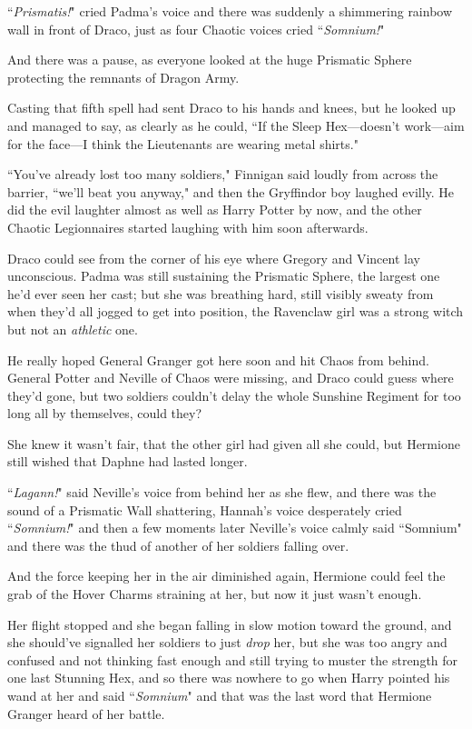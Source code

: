 ``\emph{Prismatis!}" cried Padma's voice and there was suddenly a shimmering rainbow wall in front of Draco, just as four Chaotic voices cried ``\emph{Somnium!}"

And there was a pause, as everyone looked at the huge Prismatic Sphere protecting the remnants of Dragon Army.

Casting that fifth spell had sent Draco to his hands and knees, but he looked up and managed to say, as clearly as he could, ``If the Sleep Hex—doesn't work—aim for the face—I think the Lieutenants are wearing metal shirts."

``You've already lost too many soldiers," Finnigan said loudly from across the barrier, ``we'll beat you anyway," and then the Gryffindor boy laughed evilly. He did the evil laughter almost as well as Harry Potter by now, and the other Chaotic Legionnaires started laughing with him soon afterwards.

Draco could see from the corner of his eye where Gregory and Vincent lay unconscious. Padma was still sustaining the Prismatic Sphere, the largest one he'd ever seen her cast; but she was breathing hard, still visibly sweaty from when they'd all jogged to get into position, the Ravenclaw girl was a strong witch but not an \emph{athletic} one.

He really hoped General Granger got here soon and hit Chaos from behind. General Potter and Neville of Chaos were missing, and Draco could guess where they'd gone, but two soldiers couldn't delay the whole Sunshine Regiment for too long all by themselves, could they?

\later

She knew it wasn't fair, that the other girl had given all she could, but Hermione still wished that Daphne had lasted longer.

``\emph{Lagann!}" said Neville's voice from behind her as she flew, and there was the sound of a Prismatic Wall shattering, Hannah's voice desperately cried ``\emph{Somnium!}" and then a few moments later Neville's voice calmly said ``Somnium" and there was the thud of another of her soldiers falling over.

And the force keeping her in the air diminished again, Hermione could feel the grab of the Hover Charms straining at her, but now it just wasn't enough.

Her flight stopped and she began falling in slow motion toward the ground, and she should've signalled her soldiers to just \emph{drop} her, but she was too angry and confused and not thinking fast enough and still trying to muster the strength for one last Stunning Hex, and so there was nowhere to go when Harry pointed his wand at her and said ``\emph{Somnium}" and that was the last word that Hermione Granger heard of her battle.

